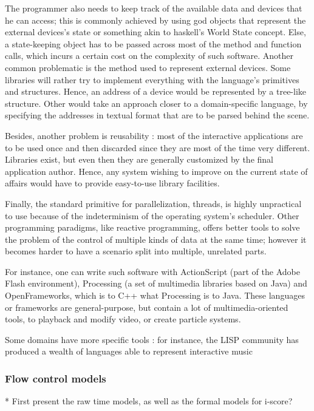 \documentclass{sigchi}
\begin{document}
The programmer also needs to keep track of the available data and devices that he can access; this is commonly achieved by using god objects that represent the external devices's state or something akin to haskell's World State concept. Else, a state-keeping object has to be passed across most of the method and function calls, which incurs a certain cost on the complexity of such software. Another common problematic is the method used to represent external devices. Some libraries will rather try to implement everything with the language's primitives and structures. Hence, an address of a device would be represented by a tree-like structure. Other would take an approach closer to a domain-specific language, by specifying the addresses in textual format that are to be parsed behind the scene. 

Besides, another problem is reusability : most of the interactive applications are to be used once and then discarded since they are most of the time very different. Libraries exist, but even then they are generally customized by the final application author. Hence, any system wishing to improve on the current state of affairs would have to provide easy-to-use library facilities.

Finally, the standard primitive for parallelization, threads, is highly unpractical to use because of the indeterminism of the operating system's scheduler. Other programming paradigms, like reactive programming, offers better tools to solve the problem of the control of multiple kinds of data at the same time; however it becomes harder to have a scenario split into multiple, unrelated parts. %

For instance, one can write such software with ActionScript (part of the Adobe Flash environment), Processing (a set of multimedia libraries based on Java) and OpenFrameworks, which is to C++ what Processing is to Java\cite{noble2009programming}. These languages or frameworks are general-purpose, but contain a lot of multimedia-oriented tools, to playback and modify video, or create particle systems. 

Some domains have more specific tools : for instance, the LISP community has produced a wealth of languages able to represent interactive music  %


\subsubsection{Flow control models}


* First present the raw time models, as well as the formal models for i-score?
\end{document}
